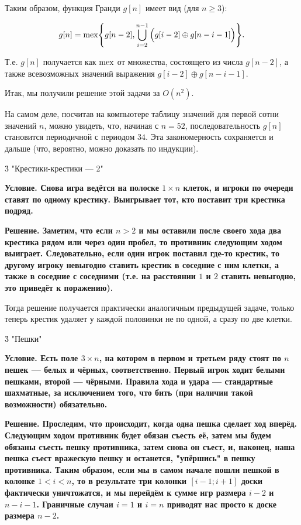 Таким образом, функция Гранди $g[n]$ имеет вид (для $n \ge 3$):

$$ g[n] = {\rm mex} \Bigg\{ g[n-2], \bigcup_{i=2}^{n-1} \Big( g[i-2] \oplus g[n-i-1] \Big) \Bigg\}. $$

Т.е. $g[n]$ получается как $\rm mex$ от множества, состоящего из числа $g[n-2]$, а также всевозможных значений выражения $g[i-2] \oplus g[n-i-1]$.

Итак, мы получили решение этой задачи за $O (n^2)$.

На самом деле, посчитав на компьютере таблицу значений для первой сотни значений $n$, можно увидеть, что, начиная с $n=52$, последовательность $g[n]$ становится периодичной с периодом $34$. Эта закономерность сохраняется и дальше (что, вероятно, можно доказать по индукции).


\h3{ "Крестики-крестики --- 2" }

\bf{Условие}. Снова игра ведётся на полоске $1 \times n$ клеток, и игроки по очереди ставят по одному крестику. Выигрывает тот, кто поставит три крестика подряд.

\bf{Решение}. Заметим, что если $n>2$ и мы оставили после своего хода два крестика рядом или через один пробел, то противник следующим ходом выиграет. Следовательно, если один игрок поставил где-то крестик, то другому игроку невыгодно ставить крестик в соседние с ним клетки, а также в соседние с соседними (т.е. на расстоянии $1$ и $2$ ставить невыгодно, это приведёт к поражению).

Тогда решение получается практически аналогичным предыдущей задаче, только теперь крестик удаляет у каждой половинки не по одной, а сразу по две клетки.


\h3{ "Пешки" }

\bf{Условие}. Есть поле $3 \times n$, на котором в первом и третьем ряду стоят по $n$ пешек --- белых и чёрных, соответственно. Первый игрок ходит белыми пешками, второй --- чёрными. Правила хода и удара --- стандартные шахматные, за исключением того, что бить (при наличии такой возможности) обязательно.

\bf{Решение}. Проследим, что происходит, когда одна пешка сделает ход вперёд. Следующим ходом противник будет обязан съесть её, затем мы будем обязаны съесть пешку противника, затем снова он съест, и, наконец, наша пешка съест вражескую пешку и останется, "упёршись" в пешку противника. Таким образом, если мы в самом начале пошли пешкой в колонке $1 < i < n$, то в результате три колонки $[i-1; i+1]$ доски фактически уничтожатся, и мы перейдём к сумме игр размера $i-2$ и $n - i - 1$. Граничные случаи $i=1$ и $i=n$ приводят нас просто к доске размера $n-2$.

